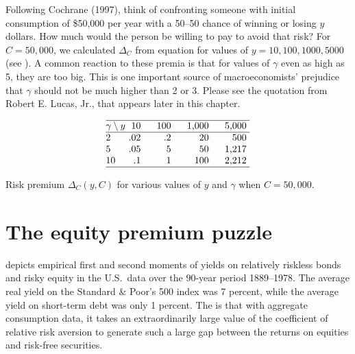 



%
Following Cochrane (1997), think of confronting
someone with initial consumption of \$50,000 per year
 with a  50--50 chance of winning or losing  $y$ dollars.  How much
would the person be willing to pay to avoid that risk?
  For $C=50,000$, we calculated $\Delta_C$ from equation 
for values of $y=10, 100, 1000, 5000$ (see  ).
A common reaction to these premia is that for values
of $\gamma$ even as high as 5, they are too big.   This
is one important source of macroeconomists' prejudice
that $\gamma$ should not be much higher than 2 or 3. Please see the quotation
from Robert E. Lucas, Jr., that appears later in this chapter.
\bigskip
{}

$$\vbox{\offinterlineskip
\hrule
\halign{\strut #\hfil & \hfil# &\quad \hfil# &\quad \hfil#
&\quad \hfil#\cr
$\gamma \setminus y$  &  10  & 100 & 1,000 & 5,000 \cr \noalign{\hrule}
2 & .02 & .2 & 20 & 500 \cr
5 & .05 & 5 & 50 & 1,217 \cr
10 & .1 & 1 & 100 & 2,212 \cr\noalign{\hrule}
}}$$
\caption{Risk premium $\Delta_C(y,C)$ for various
values of $y$ and $\gamma$ when $C = 50,000$.}
\endtable

\section{The equity premium puzzle}\label{sec:equitypremium}%
 depicts empirical  first and second moments  of  yields on relatively riskless bonds and risky equity in the
U.S.\ data over the $90$-year period 1889--1978. The average real yield on the Standard \& Poor's 500 index
was 7 percent, while the average yield on short-term debt was only
1 percent.   The  is that with aggregate consumption data, it takes an extraordinarily large value of
the coefficient of relative risk aversion to generate such a large gap between the returns on equities and risk-free securities.
\medskip
{}

